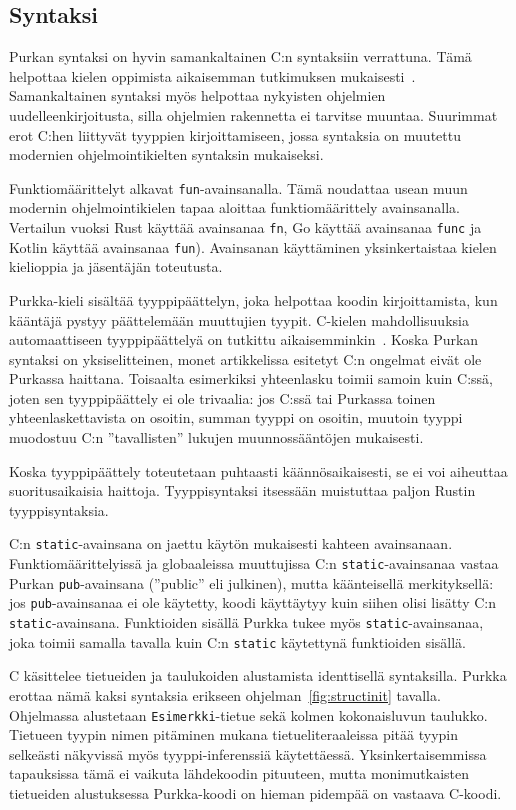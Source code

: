 \subsection{Syntaksi}

Purkan syntaksi on hyvin samankaltainen C:n syntaksiin verrattuna. Tämä
helpottaa kielen oppimista aikaisemman tutkimuksen
mukaisesti~\citep{languagelearning}. Samankaltainen syntaksi myös helpottaa
nykyisten ohjelmien uudelleenkirjoitusta, silla ohjelmien rakennetta ei
tarvitse muuntaa. Suurimmat erot C:hen liittyvät tyyppien kirjoittamiseen,
jossa syntaksia on muutettu modernien ohjelmointikielten syntaksin mukaiseksi.

Funktiomäärittelyt alkavat \texttt{fun}-avainsanalla. Tämä noudattaa usean muun
modernin ohjelmointikielen tapaa aloittaa funktiomäärittely avainsanalla.
Vertailun vuoksi Rust käyttää avainsanaa \texttt{fn}, Go käyttää avainsanaa
\texttt{func} ja Kotlin käyttää avainsanaa \texttt{fun}). Avainsanan
käyttäminen yksinkertaistaa kielen kielioppia ja jäsentäjän toteutusta.

Purkka-kieli sisältää tyyppipäättelyn, joka helpottaa koodin kirjoittamista,
kun kääntäjä pystyy päättelemään muuttujien tyypit. C-kielen mahdollisuuksia
automaattiseen tyyppipäättelyä on tutkittu
aikaisemminkin~\citep[mm.][]{ctypeinference}. Koska Purkan syntaksi on
yksiselitteinen, monet artikkelissa esitetyt C:n ongelmat eivät ole Purkassa
haittana. Toisaalta esimerkiksi yhteenlasku toimii samoin kuin C:ssä, joten sen
tyyppipäättely ei ole trivaalia: jos C:ssä tai Purkassa toinen
yhteenlaskettavista on osoitin, summan tyyppi on osoitin, muutoin tyyppi
muodostuu C:n ''tavallisten'' lukujen muunnossääntöjen mukaisesti.

Koska tyyppipäättely toteutetaan puhtaasti käännösaikaisesti, se ei voi
aiheuttaa suoritusaikaisia haittoja. Tyyppisyntaksi itsessään muistuttaa paljon
Rustin tyyppisyntaksia.

C:n \texttt{static}-avainsana on jaettu käytön mukaisesti kahteen avainsanaan.
Funktiomäärittelyissä ja globaaleissa muuttujissa C:n
\texttt{static}-avainsanaa vastaa Purkan \texttt{pub}-avainsana (''public'' eli
julkinen), mutta käänteisellä merkityksellä: jos \texttt{pub}-avainsanaa ei ole
käytetty, koodi käyttäytyy kuin siihen olisi lisätty C:n
\texttt{static}-avainsana. Funktioiden sisällä Purkka tukee myös
\texttt{static}-avainsanaa, joka toimii samalla tavalla kuin C:n
\texttt{static} käytettynä funktioiden sisällä.

C käsittelee tietueiden ja taulukoiden alustamista identtisellä syntaksilla.
Purkka erottaa nämä kaksi syntaksia erikseen ohjelman~\ref{fig:structinit}
tavalla. Ohjelmassa alustetaan \texttt{Esimerkki}-tietue sekä kolmen
kokonaisluvun taulukko. Tietueen tyypin nimen pitäminen mukana
tietueliteraaleissa pitää tyypin selkeästi näkyvissä myös tyyppi-inferenssiä
käytettäessä. Yksinkertaisemmissa tapauksissa tämä ei vaikuta lähdekoodin
pituuteen, mutta monimutkaisten tietueiden alustuksessa Purkka-koodi on
hieman pidempää on vastaava C-koodi.

